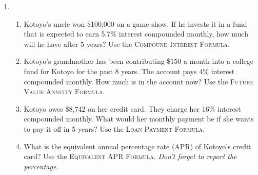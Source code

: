 \begin{enumerate}
\newpage %

 \item  \begin{enumerate} 
\item Kotoyo's uncle won \$100,000 on a game show.  If he invests it in a fund that is expected to earn 5.7\% interest compounded monthly, how much will he have after 5 years? Use the \textsc{Compound Interest Formula}.  \vfill 
\item Kotoyo's grandmother has been contributing \$150 a month into a college fund for Kotoyo for the past 8 years.  The account pays 4\% interest compounded monthly.  How much is in the account now? Use the \textsc{Future Value Annuity Formula}. \vfill  
\item Kotoyo owes \$8,742 on her credit card.  They charge her 16\% interest compounded monthly.  What would her monthly payment be if she wants to pay it off in 5 years? Use the \textsc{Loan Payment Formula}.  \vfill 
\item What is the equivalent annual percentage rate (APR) of Kotoyo's credit card? Use the \textsc{Equivalent APR Formula}.  \emph{Don't forget to report the percentage.} \vfill 
\end{enumerate} 


\end{enumerate}

